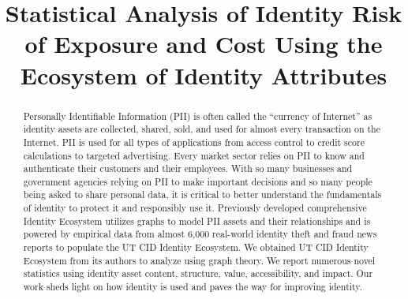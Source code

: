 \documentclass[conference]{IEEEtran}
\begin{document}
\title{Statistical  Analysis  of  Identity  Risk of Exposure  and  Cost  Using  the Ecosystem  of  Identity  Attributes
}


\maketitle

\begin{abstract}
Personally Identifiable Information (PII) is often called the ``currency of Internet'' as identity assets are collected, shared, sold, and used for almost every transaction on the Internet.  PII is used for all types of applications from access control to credit score calculations to targeted advertising.  Every market sector relies on PII to know and authenticate their customers and their employees.   With so many businesses and government agencies relying on PII to make important decisions and so many people being asked to share personal data, it is critical to better understand the fundamentals of identity to protect it and responsibly use it.  Previously developed  comprehensive Identity Ecosystem utilizes graphs to model PII assets and their relationships and is powered by empirical data from almost 6,000 real-world identity theft and fraud news reports to populate the UT CID Identity Ecosystem. We obtained UT CID Identity Ecosystem from its authors to analyze using graph theory. We report numerous novel statistics using identity asset content, structure, value, accessibility, and impact.  Our work sheds light on how identity is used and paves the way for improving identity.
\end{abstract}
\end{document}
